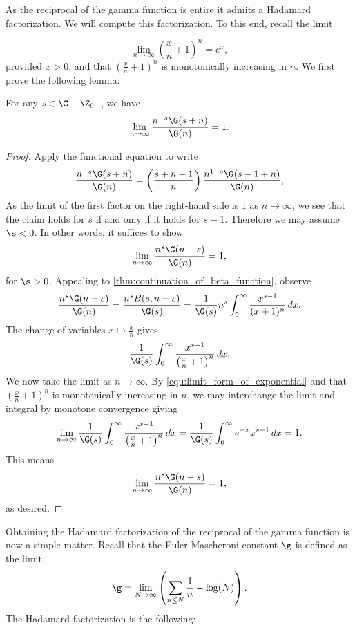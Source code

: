 \documentclass[12pt]{article}
\begin{document}
    As the reciprocal of the gamma function is entire it admits a Hadamard factorization. We will compute this factorization. To this end, recall the limit

    \begin{equation}\label{equ:limit_form_of_exponential}
      \lim_{n \to \infty}\left(\frac{x}{n}+1\right)^{n} = e^{x},
    \end{equation}
    provided \(x > 0\), and that \(\left(\frac{x}{n}+1\right)^{n}\) is monotonically increasing in \(n\). We first prove the following lemma:

    \begin{lemma}\label{lem:Hadamard_factorization_of_gamma_function_lemma}
      For any \(s \in \C-\Z_{0-}\), we have
      \[
        \lim_{n \to \infty}\frac{n^{-s}\G(s+n)}{\G(n)} = 1.
      \]
    \end{lemma}
    \begin{proof}
      Apply the functional equation to write
      \[
        \frac{n^{-s}\G(s+n)}{\G(n)} = \left(\frac{s+n-1}{n}\right)\frac{n^{1-s}\G(s-1+n)}{\G(n)},
      \]
      As the limit of the first factor on the right-hand side is \(1\) as \(n \to \infty\), we see that the claim holds for \(s\) if and only if it holds for \(s-1\). Therefore we may assume \(\s < 0\). In other words, it suffices to show
      \[
        \lim_{n \to \infty}\frac{n^{s}\G(n-s)}{\G(n)} = 1,
      \]
      for \(\s > 0\). Appealing to \cref{thm:continuation_of_beta_function}, observe
      \[
       \frac{n^{s}\G(n-s)}{\G(n)} = \frac{n^{s}B(s,n-s)}{\G(s)} = \frac{1}{\G(s)}n^{s}\int_{0}^{\infty}\frac{x^{s-1}}{(x+1)^{n}}\,dx.
      \]
      The change of variables \(x \mapsto \frac{x}{n}\) gives
      \[ 
        \frac{1}{\G(s)}\int_{0}^{\infty}\frac{x^{s-1}}{\left(\frac{x}{n}+1\right)^{n}}\,dx.
      \]
      We now take the limit as \(n \to \infty\). By \cref{equ:limit_form_of_exponential} and that \(\left(\frac{x}{n}+1\right)^{n}\) is monotonically increasing in \(n\), we may interchange the limit and integral by monotone convergence giving
      \[
        \lim_{n \to \infty}\frac{1}{\G(s)}\int_{0}^{\infty}\frac{x^{s-1}}{\left(\frac{x}{n}+1\right)^{n}}\,dx = \frac{1}{\G(s)}\int_{0}^{\infty}e^{-x}x^{s-1}\,dx = 1.
      \]
      This means
      \[
        \lim_{n \to \infty}\frac{n^{s}\G(n-s)}{\G(n)} = 1,
      \]
      as desired.
    \end{proof}

    Obtaining the Hadamard factorization of the reciprocal of the gamma function is now a simple matter. Recall that the Euler-Mascheroni constant \(\g\) is defined as the limit
    \begin{equation}\label{equ:Euler-Mascheroni_constant_definition}
      \g = \lim_{N \to \infty}\left(\sum_{n \le N}\frac{1}{n}-\log(N)\right).
    \end{equation}
    The Hadamard factorization is the following:
\end{document}
